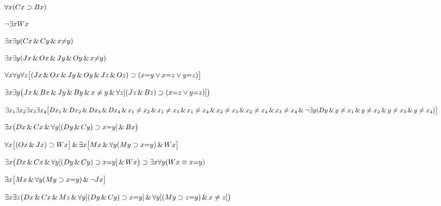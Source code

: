 \begin{earg}
\item %
$\forall x(Cx \supset Bx)$
\item %
$\neg\exists x Wx$
\item %
$\exists x \exists y(Cx \,\&\, Cy \,\&\, x{\neq} y)$
\item %
$\exists x \exists y(Jx \,\&\, Ox \,\&\, Jy \,\&\, Oy \,\&\, x{\neq} y)$
\item %
$\forall x\forall y\forall z\bigl[(Jx \,\&\, Ox \,\&\, Jy \,\&\, Oy \,\&\, Jz \,\&\, Oz)\supset(x{=}y \vee x{=}z \vee y{=}z)\bigr]$
\item %
$\exists x\exists y\bigl(Jx \,\&\, Bx \,\&\, Jy \,\&\, By \,\&\, x \neq y\,\&\, \forall z[(Jz \,\&\, Bz) \supset (x{=}z \vee y{=}z)]\bigr)$
\item %
$\exists x_1\exists x_2\exists x_3\exists x_4\bigl[Dx_1 \,\&\, Dx_2 \,\&\, Dx_3 \,\&\, Dx_4 \,\&\, x_1 \neq x_2 \,\&\, x_1 \neq x_3 \,\&\, x_1 \neq x_4 \,\&\, x_2 \neq x_3 \,\&\, x_2 \neq x_4 \,\&\, x_3 \neq x_4  \,\&\, \neg\exists y(Dy \,\&\, y\neq x_1 \,\&\, y\neq x_2 \,\&\, y\neq x_3 \,\&\, y\neq x_4)\bigr]$
\item %
$\exists x\bigl(Dx \,\&\, Cx \,\&\, \forall y[(Dy\,\&\, Cy) \supset x{=}y] \,\&\, Bx\bigr)$
\item %
$\forall x\bigl[(Ox \,\&\, Jx) \supset Wx\bigr] \,\&\, \exists x\bigl[Mx \,\&\, \forall y(My \supset x{=}y) \,\&\, Wx\bigr]$
\item %
$\exists x\bigl(Dx \,\&\, Cx \,\&\, \forall y[(Dy\,\&\, Cy) \supset x{=}y] \,\&\, Wx\bigr)\supset \exists x\forall y(Wx \equiv x{=}y)$
\item %
$\exists x\bigl[Mx \,\&\, \forall y(My \supset x{=}y) \,\&\, \neg Jx\bigr]$
\item %
$\exists x\exists z\bigl(Dx \,\&\, Cx \,\&\, Mz \,\&\, \forall y[(Dy\,\&\, Cy) \supset x{=}y]  \,\&\, \forall y[(My \supset z{=}y) \,\&\, x\neq z]\bigr)$
\end{earg}




